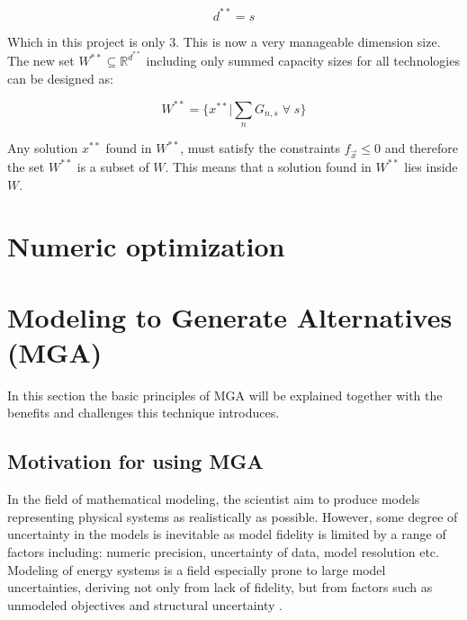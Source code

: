 \begin{equation} \label{eq:dim_d**}
d^{**} = s
\end{equation}

Which in this project is only $3$. This is now a very manageable dimension size. The new set $W^{**} \subseteq \mathbb{R}^{d^{**}}$ including only summed capacity sizes for all technologies can be designed as:

\begin{equation}
	W^{**} = \{ x^{**}  | \sum_n G_{n,s} \; \forall \; s  \}
\end{equation}


Any solution $x^{**}$ found in $W^{**}$, must satisfy the constraints $f_{\vec{x}} \leq 0$ and therefore the set $W^{**}$ is a subset of $W$. This means that a solution found in $W^{**}$ lies inside $W$.


\section{Numeric optimization}



\section{Modeling to Generate Alternatives (MGA)}\label{sec:MGA}
In this section the basic principles of MGA will be explained together with the benefits and challenges this technique introduces. 

\subsection{Motivation for using MGA}

In the field of mathematical modeling, the scientist aim to produce models representing physical systems as realistically as possible. However, some degree of uncertainty in the models is inevitable as model fidelity is limited by a range of factors including: numeric precision, uncertainty of data, model resolution etc. Modeling of energy systems is a field especially prone to large model uncertainties, deriving not only from lack of fidelity, but from factors such as unmodeled objectives and structural uncertainty \cite{DeCarolis_MGA}. 

